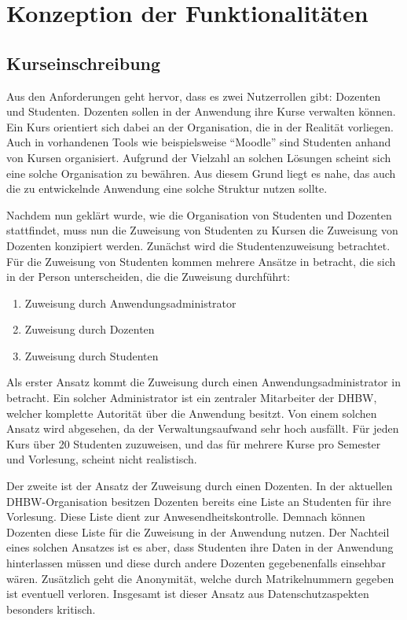 \section{Konzeption der Funktionalitäten}


\subsection{Kurseinschreibung} %
Aus den Anforderungen geht hervor, dass es zwei Nutzerrollen gibt: Dozenten und Studenten.
Dozenten sollen in der Anwendung ihre Kurse verwalten können.
Ein Kurs orientiert sich dabei an der Organisation, die in der Realität vorliegen.
Auch in vorhandenen Tools wie beispielsweise \enquote{Moodle} sind Studenten anhand von Kursen organisiert.
Aufgrund der Vielzahl an solchen Lösungen scheint sich eine solche Organisation zu bewähren.
Aus diesem Grund liegt es nahe, das auch die zu entwickelnde Anwendung eine solche Struktur nutzen sollte.

Nachdem nun geklärt wurde, wie die Organisation von Studenten und Dozenten stattfindet, muss nun die Zuweisung von Studenten zu Kursen die Zuweisung von Dozenten konzipiert werden.
Zunächst wird die Studentenzuweisung betrachtet.
Für die Zuweisung von Studenten kommen mehrere Ansätze in betracht, die sich in der Person unterscheiden, die die Zuweisung durchführt:
\begin{enumerate}
    \item Zuweisung durch Anwendungsadministrator
    \item Zuweisung durch Dozenten
    \item Zuweisung durch Studenten
\end{enumerate}
Als erster Ansatz kommt die Zuweisung durch einen Anwendungsadministrator in betracht.
Ein solcher Administrator ist ein zentraler Mitarbeiter der DHBW, welcher komplette Autorität über die Anwendung besitzt.
Von einem solchen Ansatz wird abgesehen, da der Verwaltungsaufwand sehr hoch ausfällt.
Für jeden Kurs über 20 Studenten zuzuweisen, und das für mehrere Kurse pro Semester und Vorlesung, scheint nicht realistisch.

Der zweite ist der Ansatz der Zuweisung durch einen Dozenten.
In der aktuellen DHBW-Organisation besitzen Dozenten bereits eine Liste an Studenten für ihre Vorlesung.
Diese Liste dient zur Anwesendheitskontrolle.
Demnach können Dozenten diese Liste für die Zuweisung in der Anwendung nutzen.
Der Nachteil eines solchen Ansatzes ist es aber, dass Studenten ihre Daten in der Anwendung hinterlassen müssen und diese durch andere Dozenten gegebenenfalls einsehbar wären.
Zusätzlich geht die Anonymität, welche durch Matrikelnummern gegeben ist eventuell verloren.
Insgesamt ist dieser Ansatz aus Datenschutzaspekten besonders kritisch. %

